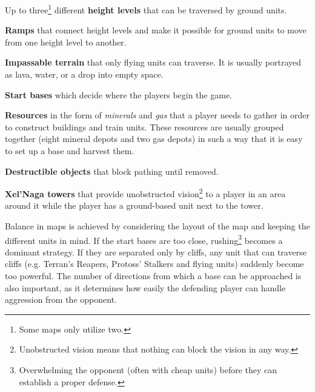 \begin{my_itemize}

	\item Up to three\footnote{Some maps only utilize two.} different \textbf{height levels} that can be traversed by ground units.

	\item \textbf{Ramps} that connect height levels and make it possible for ground units to move from one height level to another.

	\item \textbf{Impassable terrain} that only flying units can traverse. It is usually portrayed as lava, water, or a drop into empty space.

	\item \textbf{Start bases} which decide where the players begin the game.

	\item \textbf{Resources} in the form of \textit{minerals} and \textit{gas} that a player needs to gather in order to construct buildings and train units. These resources are usually grouped together (eight mineral depots and two gas depots) in such a way that it is easy to set up a base and harvest them.

	\item \textbf{Destructible objects} that block pathing until removed.

	\item \textbf{Xel'Naga towers} that provide unobstructed vision\footnote{Unobstructed vision means that nothing can block the vision in any way.} to a player in an area around it while the player has a ground-based unit next to the tower.

\end{my_itemize}

Balance in maps is achieved by considering the layout of the map and keeping the different units in mind. If the start bases are too close, rushing\footnote{Overwhelming the opponent (often with cheap units) before they can establish a proper defense.} becomes a dominant strategy. If they are separated only by cliffs, any unit that can traverse cliffs (e.g. Terran's Reapers, Protoss' Stalkers and flying units) suddenly become too powerful. The number of directions from which a base can be approached is also important, as it determines how easily the defending player can handle aggression from the opponent.

